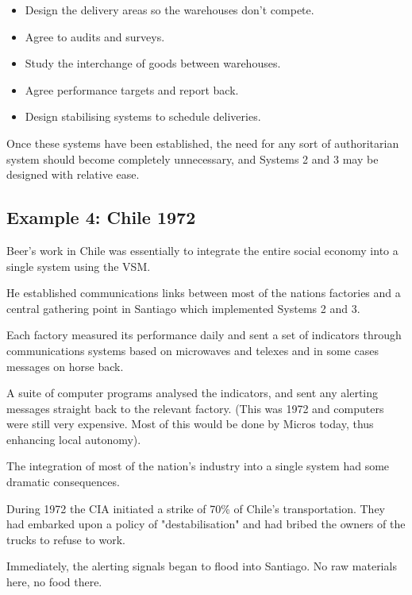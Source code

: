 \begin{itemize}
  \item Design the delivery areas so the warehouses don't compete.

  \item Agree to audits and surveys.

  \item Study the interchange of goods between warehouses.

  \item Agree performance targets and report back.

  \item Design stabilising systems to schedule deliveries.

\end{itemize}

Once these systems have been established, the need for any sort of authoritarian system should become completely unnecessary, and Systems 2 and 3 may be designed with relative ease.

\subsection*{Example 4: Chile 1972}
Beer's work in Chile was essentially to integrate the entire social economy into a single system using the VSM.

He established communications links between most of the nations factories and a central gathering point in Santiago which implemented Systems 2 and 3.

Each factory measured its performance daily and sent a set of indicators through communications systems based on microwaves and telexes and in some cases messages on horse back.

A suite of computer programs analysed the indicators, and sent any alerting messages straight back to the relevant factory. (This was 1972 and computers were still very expensive. Most of this would be done by Micros today, thus enhancing local autonomy).

The integration of most of the nation's industry into a single system had some dramatic consequences.

During 1972 the CIA initiated a strike of 70\% of Chile's transportation. They had embarked upon a policy of "destabilisation" and had bribed the owners of the trucks to refuse to work.

Immediately, the alerting signals began to flood into Santiago. No raw materials here, no food there.

